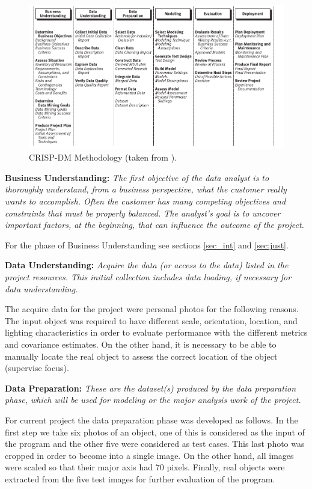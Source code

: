 \documentclass[11pt]{article}
\theoremstyle{definition}
\theoremstyle{remark}
\theoremstyle{remark}
\theoremstyle{remark}
\begin{document}
\begin{figure}[H]
  \centering \includegraphics[width = 0.8\linewidth]{crisp-dm.png}
  \caption{CRISP-DM Methodology (taken from \cite{Chapman2000CRISPDM1S}).}
  \label{fig:crisp-dm}
\end{figure}

\textbf{Business Understanding:} \textit{The first objective of the data analyst
  is to thoroughly understand, from a business perspective, what the customer
  really wants to accomplish. Often the customer has many competing objectives
  and constraints that must be properly balanced. The analyst’s goal is to
  uncover important factors, at the beginning, that can influence the outcome of
  the project.}

For the phase of Business Understanding see sections \ref{sec_int} and
\ref{sec:just}.

\textbf{Data Understanding:} \textit{Acquire the data (or access to the data)
  listed in the project resources. This initial collection includes data
  loading, if necessary for data understanding.}

The acquire data for the project were personal photos for the following reasons.
The input object was required to have different scale, orientation, location,
and lighting characteristics in order to evaluate performance with the different
metrics and covariance estimates. On the other hand, it is necessary to be able
to manually locate the real object to assess the correct location of the object
(supervise focus).

\textbf{Data Preparation:} \textit{These are the dataset(s) produced by the data
  preparation phase, which will be used for modeling or the major analysis work
  of the project.}

For current project the data preparation phase was developed as follows. In the
first step we take six photos of an object, one of this is considered as the
input of the program and the other five were considered as test cases. This last
photo was cropped in order to become into a single image. On the other hand, all
images were scaled so that their major axis had 70 pixels. Finally, real objects
were extracted from the five test images for further evaluation of the program.
\end{document}
